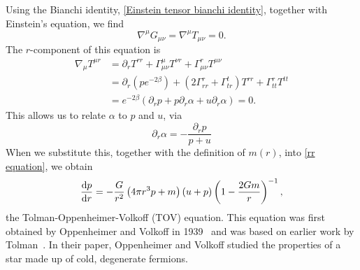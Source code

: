 Using the Bianchi identity, \autoref{Einstein tensor bianchi identity}, together with Einstein's equation, we find
%
\begin{equation}
    \nabla^\mu G_{\mu \nu} = \nabla^\mu T_{\mu \nu} = 0.
\end{equation}
%
The $r$-component of this equation is
%
\begin{align*}
    \nabla_\mu T^{\mu r} 
    & =
    \partial_r T^{rr} 
    + \Gamma^\mu_{\mu \nu} T^{\nu r} 
    + \Gamma^r_{\mu \nu} T^{\mu \nu}\\
    & = 
    \partial_r \left(p e^{-2\beta}\right)
    + (2 \Gamma^r_{rr} + \Gamma^t_{tr}) T^{rr} 
    + \Gamma^r_{tt}T^{tt} \\ 
    &=   e^{-2\beta} \left( \partial_r p + p \partial_r \alpha + u \partial_r \alpha \right) = 0.
\end{align*} 
%
This allows us to relate $\alpha$ to $p$ and $u$, via
\begin{equation}
    \partial_r \alpha = - \frac{\partial_r p}{p + u}
\end{equation}
%
When we substitute this, together with the definition of $m(r)$, into \autoref{rr equation}, we obtain
%
\begin{equation}
    \label{TOV}
    \diff{p}{r}
    =
    -
    \frac{G}{r^2} 
    \left(4 \pi r^{3} p + m \right) 
    \left(u + p \right)
    \left(1 - \frac{2 G m}{r}\right)^{-1},
\end{equation}
%
the Tolman-Oppenheimer-Volkoff (TOV) equation.
This equation was first obtained by Oppenheimer and Volkoff in 1939~\autocite{oppenheimerMassiveNeutronCores1939} and was based on earlier work by Tolman~\autocite{tolmanRelativityThermodynamicsCosmology1934}.
In their paper, Oppenheimer and Volkoff studied the properties of a star made up of cold, degenerate fermions.


